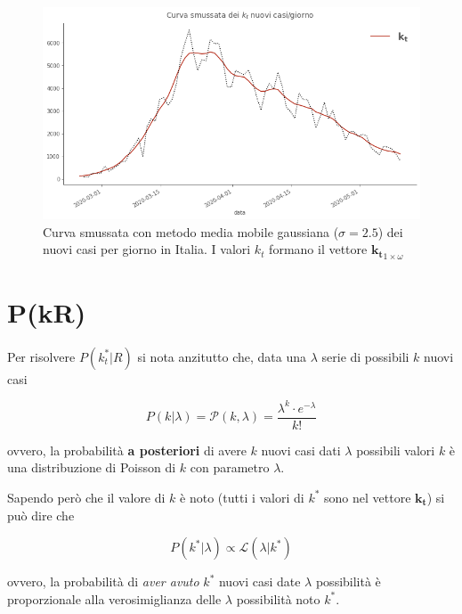 \documentclass[11pt]{article}
\begin{document}
    \begin{figure}
    \centering
        \includegraphics{kt.png}
        \caption{Curva smussata con metodo media mobile gaussiana ($\sigma=2.5$) dei nuovi casi per giorno in Italia. I valori $k_t$ formano il vettore $\mathbf{k_t}_{1 \times \omega}$}
        \label{fig:kt}
    \end{figure}

    
    \hypertarget{pkr}{%
\section{P(k\textbar R)}\label{pkr}}

    Per risolvere \(P(k_t^*|R)\) si nota anzitutto che, data una \(\lambda\)
serie di possibili \(k\) nuovi casi

\begin{equation}\label{eq:poisson}
P(k|\lambda) = \mathscr{P}(k, \lambda) = \frac{\lambda^k \cdot e^{-\lambda}}{k!}
\end{equation}

ovvero, la probabilità \textbf{a posteriori} di avere \(k\) nuovi casi
dati \(\lambda\) possibili valori \(k\) è una distribuzione di Poisson
di \(k\) con parametro \(\lambda\).

Sapendo però che il valore di \(k\) è noto (tutti i valori di \(k^*\)
sono nel vettore \(\mathbf{k_t}\)) si può dire che

\begin{equation}\label{eq:likelihoods}
P(k^*|\lambda) \propto \mathscr{L}(\lambda|k^*)
\end{equation}

ovvero, la probabilità di \emph{aver avuto} \(k^*\) nuovi casi date
\(\lambda\) possibilità è proporzionale alla verosimiglianza delle
\(\lambda\) possibilità noto \(k^*\).
\end{document}
